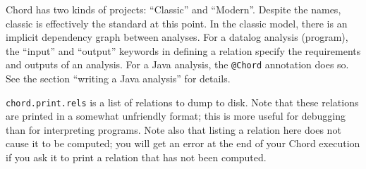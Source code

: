 Chord has two kinds of projects: ``Classic'' and ``Modern''.  Despite the names, classic is effectively the standard at this point.
In the classic model, there is an implicit dependency graph between analyses. For a datalog analysis (program), the ``input'' and ``output'' keywords in defining a relation specify the requirements and outputs of an analysis.  For a Java analysis, the \texttt{@Chord} annotation does so. See the section ``writing a Java analysis'' for details.

\texttt{chord.print.rels} is a list of relations to dump to disk. Note that these relations are printed in a somewhat unfriendly format; this is more useful for debugging than for interpreting programs. Note also that listing a relation here does not cause it to be computed; you will get an error at the end of your Chord execution if you ask it to print a relation that has not been computed.


